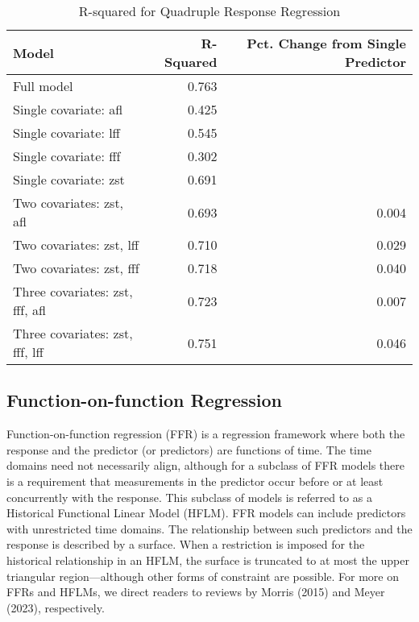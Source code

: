 \begin{table}

\caption{\label{tab:M4}R-squared for Quadruple Response Regression}
\centering
\begin{tabular}[t]{l|r|r}
\hline
Model & R-Squared & Pct. Change from Single Predictor\\
\hline
Full model & 0.763 & \\
\hline
Single covariate: afl & 0.425 & \\
\hline
Single covariate: lff & 0.545 & \\
\hline
Single covariate: fff & 0.302 & \\
\hline
Single covariate: zst & 0.691 & \\
\hline
Two covariates: zst, afl & 0.693 & 0.004\\
\hline
Two covariates: zst, lff & 0.710 & 0.029\\
\hline
Two covariates: zst, fff & 0.718 & 0.040\\
\hline
Three covariates: zst, fff, afl & 0.723 & 0.007\\
\hline
Three covariates: zst, fff, lff & 0.751 & 0.046\\
\hline
\end{tabular}
\end{table}

\hypertarget{function-on-function-regression}{%
\subsection{Function-on-function Regression}\label{function-on-function-regression}}

Function-on-function regression (FFR) is a regression framework where both the response and the predictor (or predictors) are functions of time. The time domains need not necessarily align, although for a subclass of FFR models there is a requirement that measurements in the predictor occur before or at least concurrently with the response. This subclass of models is referred to as a Historical Functional Linear Model (HFLM). FFR models can include predictors with unrestricted time domains. The relationship between such predictors and the response is described by a surface. When a restriction is imposed for the historical relationship in an HFLM, the surface is truncated to at most the upper triangular region---although other forms of constraint are possible. For more on FFRs and HFLMs, we direct readers to reviews by Morris (2015) and Meyer (2023), respectively.

